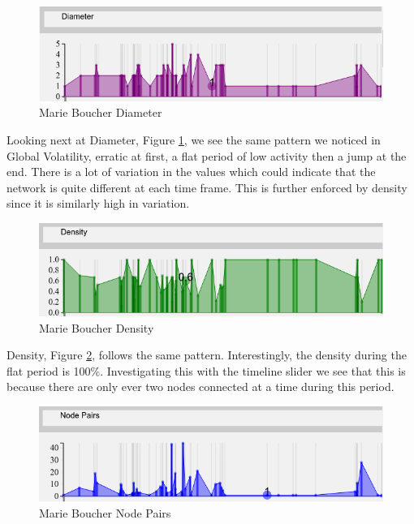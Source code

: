 \begin{figure}[h!]
  \begin{center}
  \includegraphics[trim={0 0 0 0}, width=140mm]{./Figures/marieBoucherDiameter.png}
  \caption{Marie Boucher Diameter}
  \label{fig:marieBoucherDiameter}
  \end{center}
\end{figure}

Looking next at Diameter, Figure \ref{fig:marieBoucherDiameter}, we see the same pattern we noticed in Global Volatility, erratic at first, a flat period of low activity then a jump at the end. There is a lot of variation in the values which could indicate that the network is quite different at each time frame. This is further enforced by density since it is similarly high in variation.

\begin{figure}[h!]
  \begin{center}
  \includegraphics[trim={0 0 0 0}, width=140mm]{./Figures/marieBoucherDensity.png}
  \caption{Marie Boucher Density}
  \label{fig:marieBoucherDensity}
  \end{center}
\end{figure}

Density, Figure \ref{fig:marieBoucherDensity}, follows the same pattern. Interestingly, the density during the flat period is 100\%. Investigating this with the timeline slider we see that this is because there are only ever two nodes connected at a time during this period. 

\begin{figure}[H]
  \begin{center}
  \includegraphics[trim={0 0 0 0}, width=140mm]{./Figures/marieBoucherNodePairs.png}
  \caption{Marie Boucher Node Pairs}
  \label{fig:marieBoucherNodePairs}
  \end{center}
\end{figure}

